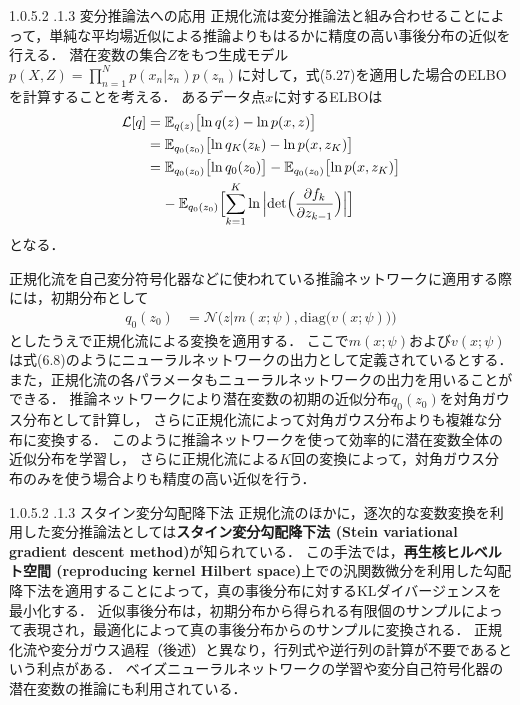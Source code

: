 \documentclass[11pt,a4paper]{jsarticle}
\makeatletter
\numberwithin{equation}{section}
\newcommand{\subsubsubsection}{\@startsection{paragraph}{4}{\z@}%
	{1.0\Cvs \@plus.5\Cdp \@minus.2\Cdp}%
	{.1\Cvs \@plus.3\Cdp}%
	{\reset@font\sffamily\normalsize}
}
\makeatother
\begin{document}
\subsubsubsection{変分推論法への応用}
正規化流は変分推論法と組み合わせることによって，単純な平均場近似による推論よりもはるかに精度の高い事後分布の近似を行える．
潜在変数の集合$Z$をもつ生成モデル$p(X, Z) = \prod_{n=1}^N p(x_n | z_n) p(z_n)$に対して，式(5.27)を適用した場合のELBOを計算することを考える．
あるデータ点$x$に対するELBOは
\begin{align}
\mathcal{L} [q]
& =
\mathbb{E}_{q(z)} \bigl[ \mathrm{ln} \, q(z) - \mathrm{ln} \, p(x, z) \bigr] \nonumber \\
& =
\mathbb{E}_{q_0(z_0)} \bigl[ \mathrm{ln} \, q_K(z_k) - \mathrm{ln} \, p(x, z_K) \bigr] \nonumber \\
& =
\mathbb{E}_{q_0(z_0)} \bigl[ \mathrm{ln} \, q_0(z_0) \bigr] - \mathbb{E}_{q_0(z_0)} \bigl[ \mathrm{ln} \, p(x, z_K) \bigr] \nonumber \\
& \hspace{11pt}
- \mathbb{E}_{q_0(z_0)} \Bigl[ \sum_{k=1}^K \mathrm{ln} \, \Bigl| \mathrm{det} \Bigl(\frac{\partial f_k}{\partial z_{k-1}} \Bigr) \Bigr| \Bigr]
\end{align}
となる．

正規化流を自己変分符号化器などに使われている推論ネットワークに適用する際には，初期分布として
\begin{align}
q_0(z_0)
& =
\mathcal{N} \bigl( z | m(x; \psi), \mathrm{diag} \bigl( v(x; \psi) \bigr) \bigr)
\end{align}
としたうえで正規化流による変換を適用する．
ここで$m(x; \psi)$および$v(x; \psi)$は式(6.8)のようにニューラルネットワークの出力として定義されているとする．
また，正規化流の各パラメータもニューラルネットワークの出力を用いることができる．
推論ネットワークにより潜在変数の初期の近似分布$q_0(z_0)$を対角ガウス分布として計算し，
さらに正規化流によって対角ガウス分布よりも複雑な分布に変換する．
このように推論ネットワークを使って効率的に潜在変数全体の近似分布を学習し，
さらに正規化流による$K$回の変換によって，対角ガウス分布のみを使う場合よりも精度の高い近似を行う．

\subsubsubsection{スタイン変分勾配降下法}
正規化流のほかに，逐次的な変数変換を利用した変分推論法としては\textbf{スタイン変分勾配降下法 (Stein variational gradient descent method)}が知られている．
この手法では，\textbf{再生核ヒルベルト空間 (reproducing kernel Hilbert space)}上での汎関数微分を利用した勾配降下法を適用することによって，真の事後分布に対するKLダイバージェンスを最小化する．
近似事後分布は，初期分布から得られる有限個のサンプルによって表現され，最適化によって真の事後分布からのサンプルに変換される．
正規化流や変分ガウス過程（後述）と異なり，行列式や逆行列の計算が不要であるという利点がある．
ベイズニューラルネットワークの学習や変分自己符号化器の潜在変数の推論にも利用されている．
\end{document}
